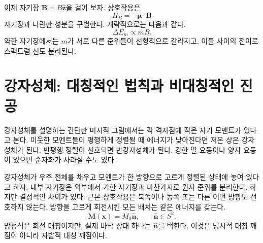 \begin{classroomqa}
\end{classroomqa}

이제 자기장 \(\mathbf B=B\hat{\mathbf z}\)을 걸어 보자. 상호작용은
\begin{equation}
H_B=-\boldsymbol{\mu}\cdot\mathbf B
\end{equation}
자기장과 나란한 성분을 구별한다. 개략적으로는 다음과 같다.
\begin{equation}
\Delta E_m\propto mB.
\label{eq:l9-zeeman}
\end{equation}
약한 자기장에서는 \(m\)가 서로 다른 준위들이 선형적으로 갈라지고, 이들 사이의 전이로 스펙트럼 선도 분리된다.

\begin{classroomqa}
\end{classroomqa}

\begin{center}
\end{center}

\section{강자성체: 대칭적인 법칙과 비대칭적인 진공}

강자성체를 설명하는 간단한 미시적 그림에서는 각 격자점에 작은 자기 모멘트가 있다고 본다. 이웃한 모멘트들이 평행하게 정렬될 때 에너지가 낮아진다면 저온 상은 강자성체가 된다. 반평행 정렬이 선호되면 반강자성체가 된다. 강한 열 요동이나 양자 요동이 있으면 순자화가 사라질 수도 있다.

강자성체가 우주 전체를 채우고 모멘트가 한 방향으로 고르게 정렬된 상태에 놓여 있다고 하자. 내부 자기장은 외부에서 가한 자기장과 마찬가지로 원자 준위를 분리한다. 하지만 결정적인 차이가 있다. 근본 상호작용은 북쪽이나 동쪽 또는 다른 어떤 방향도 선호하지 않는다. 방향을 고르게 회전시킨 모든 배치는 같은 에너지를 갖는다.
\begin{equation}
\mathbf M(\mathbf x)=M_0\hat{\mathbf n},
\qquad
\hat{\mathbf n}\in S^2.
\label{eq:l9-ferromagnetic-vacua}
\end{equation}
방정식은 회전 대칭이지만, 실제 바닥 상태 하나는 \(\hat{\mathbf n}\)를 택한다. 이것은 명시적 대칭 깨짐이 아니라 자발적 대칭 깨짐이다.

